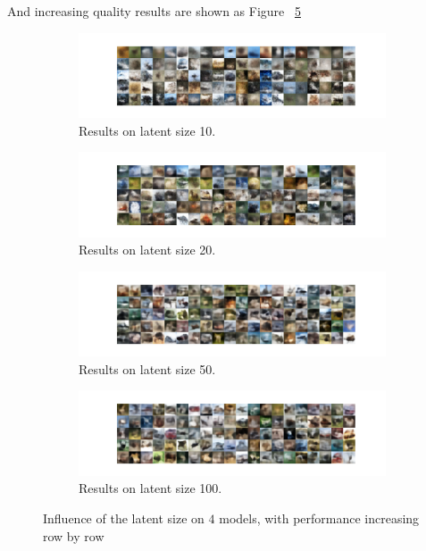\documentclass[12pt,letterpaper]{article}
\begin{document}
And increasing quality results are shown as Figure ~\ref{fig:CIFAR_VAE_latent}
\begin{figure}[h]
    \begin{subfigure}{0.495\textwidth}
    \includegraphics[width=\linewidth]{VAE_CIFAR_0_10_256.png}
    \caption{\small Results on latent size 10.} \label{fig:a}
    \end{subfigure}\hspace*{\fill}
    \begin{subfigure}{0.495\textwidth}
    \includegraphics[width=\linewidth]{VAE_CIFAR_0_20_256.png}
    \caption{\small Results on latent size 20.} \label{fig:b}
    \end{subfigure}
    
    \medskip
    \begin{subfigure}{0.495\textwidth}
    \includegraphics[width=\linewidth]{VAE_CIFAR_0_50_256.png}
    \caption{\small Results on latent size 50.} \label{fig:c}
    \end{subfigure}\hspace*{\fill}
    \begin{subfigure}{0.495\textwidth}
    \includegraphics[width=\linewidth]{VAE_CIFAR_0_100_256.png}
    \caption{\small Results on latent size 100.} \label{fig:d}
    \end{subfigure}
    
    \hspace*{\fill}
    \caption{Influence of the latent size on $4$ models, with performance increasing row by row} \label{fig:CIFAR_VAE_latent}
\end{figure}
\end{document}
